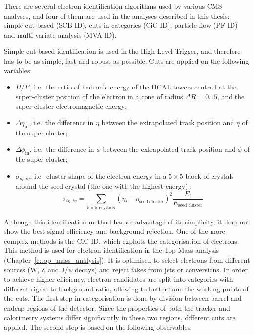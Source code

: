 There are several electron identification algorithms used by various CMS analyses, and four of them are used in the
analyses described in this thesis: simple cut-based (SCB ID), cuts in categories (CiC ID), particle flow (PF ID) and
multi-variate analysis (MVA ID).

Simple cut-based identification is used in the High-Level Trigger, and therefore has to be as simple, fast and
robust as possible. Cuts are applied on the following variables:

\begin{itemize}
  \item $H/E$, i.e.\ the ratio of hadronic energy of the HCAL towers centred at the super-cluster position of the
  electron in a cone of radius $\Delta R = 0.15$, and the super-cluster electromagnetic energy;
  \item $\Delta\eta_{\text{in}}$, i.e.\ the difference in $\eta$ between the extrapolated track position and $\eta$ of
  the super-cluster;
  \item $\Delta\phi_{\text{in}}$, i.e.\ the difference in $\phi$ between the extrapolated track position and $\phi$ of
  the super-cluster;
  \item $\sigma_{i\eta, i\eta}$, i.e.\ cluster shape of the electron energy in a $5\times5$ block of crystals around the
  seed crystal (the one with the highest energy) \cite{electron_reconstruction}:
  \begin{equation}
    \sigma_{i\eta, i\eta} = \sum_{5\times5 \text{ crystals}} \left(\eta_i - \eta_\text{seed cluster}\right)^2
    \frac{E_i}{E_{\text{seed cluster}}}
  \end{equation}
\end{itemize}

Although this identification method has an advantage of its simplicity, it does not show the best signal efficiency and
background rejection. One of the more complex methods is the CiC ID, which exploits the categorisation of electrons.
This method is used for electron identification in the Top Mass analysis (Chapter~\ref{c:top_mass_analysis}). It is
optimised to select electrons from different sources (W, Z and J/$\psi$ decays) and reject fakes from jets or
conversions. In order to achieve higher efficiency, electron candidates are split into categories with different signal
to background ratio, allowing to better tune the working points of the cuts. The first step in categorisation is done by
division between barrel and endcap regions of the detector. Since the properties of both the tracker and calorimetry
systems differ significantly in these two regions, different cuts are applied. The second step is based on the following
observables:

